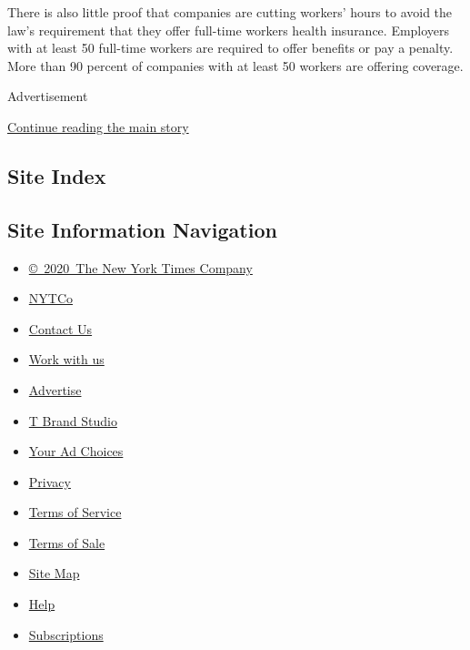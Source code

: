 There is also little proof that companies are cutting workers' hours to
avoid the law's requirement that they offer full-time workers health
insurance. Employers with at least 50 full-time workers are required to
offer benefits or pay a penalty. More than 90 percent of companies with
at least 50 workers are offering coverage.

Advertisement

\protect\hyperlink{after-bottom}{Continue reading the main story}

\hypertarget{site-index}{%
\subsection{Site Index}\label{site-index}}

\hypertarget{site-information-navigation}{%
\subsection{Site Information
Navigation}\label{site-information-navigation}}

\begin{itemize}
\tightlist
\item
  \href{https://help.nytimes.com/hc/en-us/articles/115014792127-Copyright-notice}{©~2020~The
  New York Times Company}
\end{itemize}

\begin{itemize}
\tightlist
\item
  \href{https://www.nytco.com/}{NYTCo}
\item
  \href{https://help.nytimes.com/hc/en-us/articles/115015385887-Contact-Us}{Contact
  Us}
\item
  \href{https://www.nytco.com/careers/}{Work with us}
\item
  \href{https://nytmediakit.com/}{Advertise}
\item
  \href{http://www.tbrandstudio.com/}{T Brand Studio}
\item
  \href{https://www.nytimes.com/privacy/cookie-policy\#how-do-i-manage-trackers}{Your
  Ad Choices}
\item
  \href{https://www.nytimes.com/privacy}{Privacy}
\item
  \href{https://help.nytimes.com/hc/en-us/articles/115014893428-Terms-of-service}{Terms
  of Service}
\item
  \href{https://help.nytimes.com/hc/en-us/articles/115014893968-Terms-of-sale}{Terms
  of Sale}
\item
  \href{https://spiderbites.nytimes.com}{Site Map}
\item
  \href{https://help.nytimes.com/hc/en-us}{Help}
\item
  \href{https://www.nytimes.com/subscription?campaignId=37WXW}{Subscriptions}
\end{itemize}
